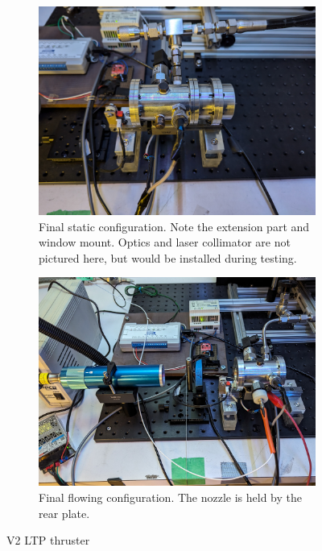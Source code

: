             \begin{figure}[!ht]
                \centering
                \begin{subfigure}[t]{0.45\textwidth}
                    \centering
                    \includegraphics[width=\textwidth]{assets/3 design/V2 Static configuration.jpg}
                    \caption{Final static configuration. Note the extension part and window mount. Optics and laser collimator are not pictured here, but would be installed during testing.}
                \end{subfigure}
                \hfill
                \begin{subfigure}[t]{0.45\textwidth}
                    \centering
                    \includegraphics[width=\textwidth]{assets/3 design/V2 flowing setup.jpg}
                    \caption{Final flowing configuration. The nozzle is held by the rear plate.}
                \end{subfigure}
                \caption{V2 LTP thruster}
                \label{fig:V2 IRL setup}
            \end{figure}

